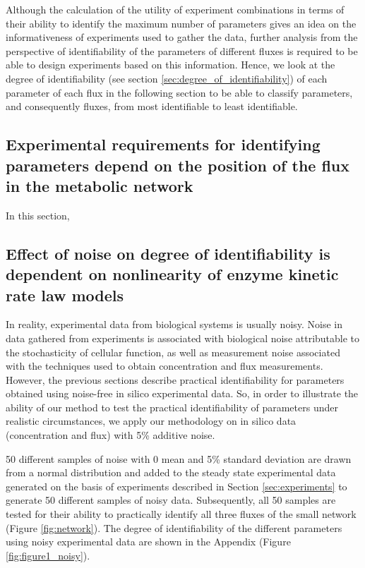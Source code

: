 \documentclass[10pt]{article}
\begin{document}
	Although the calculation of the utility of experiment combinations in terms of their ability to identify the maximum number of parameters gives an idea on the informativeness of experiments used to gather the data, further analysis from the perspective of identifiability of the parameters of different fluxes is required to be able to design experiments based on this information. Hence, we look at the degree of identifiability (see section \ref{sec:degree_of_identifiability}) of each parameter of each flux in the following section to be able to classify parameters, and consequently fluxes, from most identifiable to least identifiable.
	
	
	
	\subsection{Experimental requirements for identifying parameters depend on the position of the flux in the metabolic network}
	In this section, 
	
	\subsection{Effect of noise on degree of identifiability is dependent on nonlinearity of enzyme kinetic rate law models}\label{sec:noise}
	In reality, experimental data from biological systems is usually noisy. Noise in data gathered from experiments is associated with biological noise attributable to the stochasticity of cellular function, as well as measurement noise associated with the techniques used to obtain concentration and flux measurements. However, the previous sections describe practical identifiability for parameters obtained using noise-free in silico experimental data. So, in order to illustrate the ability of our method to test the practical identifiability of parameters under realistic circumstances, we apply our methodology on in silico data (concentration and flux) with 5\% additive noise. 
	
	50 different samples of noise with 0 mean and 5\% standard deviation are drawn from a normal distribution and added to the steady state experimental data generated on the basis of experiments described in Section \ref{sec:experiments} to generate 50 different samples of noisy data. Subsequently, all 50 samples are tested for their ability to practically identify all three fluxes of the small network (Figure \ref{fig:network}). The degree of identifiability of the different parameters using noisy experimental data are shown in the Appendix (Figure \ref{fig:figure1_noisy}). 
	
\end{document}
